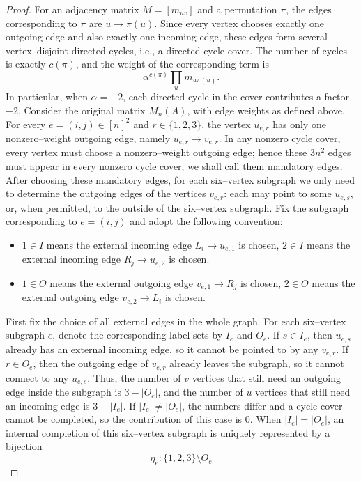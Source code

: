 \documentclass[10pt,a4paper]{amsart}
\begin{document}
\begin{proof}
For an adjacency matrix $M=[m_{uv}]$ and a permutation $\pi$, the edges corresponding to $\pi$ are $u\to\pi(u)$. Since every vertex chooses exactly one outgoing edge and also exactly one incoming edge, these edges form several vertex–disjoint directed cycles, i.e., a directed cycle cover. The number of cycles is exactly $c(\pi)$, and the weight of the corresponding term is
\[
  \alpha^{c(\pi)}\prod_u m_{u\pi(u)}.
\]
In particular, when $\alpha=-2$, each directed cycle in the cover contributes a factor $-2$. Consider the original matrix $M_n(A)$, with edge weights as defined above. For every $e=(i,j)\in[n]^2$ and $r\in\{1,2,3\}$, the vertex $u_{e,r}$ has only one nonzero–weight outgoing edge, namely $u_{e,r}\longrightarrow v_{e,r}$.
In any nonzero cycle cover, every vertex must choose a nonzero–weight outgoing edge; hence these $3n^2$ edges must appear in every nonzero cycle cover; we shall call them mandatory edges. After choosing these mandatory edges, for each six–vertex subgraph we only need to determine the outgoing edges of the vertices $v_{e,r}$: each may point to some $u_{e,s}$, or, when permitted, to the outside of the six–vertex subgraph. Fix the subgraph corresponding to $e=(i,j)$ and adopt the following convention:
\begin{itemize}
\item $1\in I$ means the external incoming edge $L_i\to u_{e,1}$ is chosen,
      $2\in I$ means the external incoming edge $R_j\to u_{e,2}$ is chosen.
\item $1\in O$ means the external outgoing edge $v_{e,1}\to R_j$ is chosen,
      $2\in O$ means the external outgoing edge $v_{e,2}\to L_i$ is chosen.
\end{itemize}
First fix the choice of all external edges in the whole graph. For each six–vertex subgraph $e$, denote the corresponding label sets by $I_e$ and $O_e$. If $s\in I_e$, then $u_{e,s}$ already has an external incoming edge, so it cannot be pointed to by any $v_{e,r}$. If $r\in O_e$, then the outgoing edge of $v_{e,r}$ already leaves the subgraph, so it cannot connect to any $u_{e,s}$. Thus, the number of $v$ vertices that still need an outgoing edge inside the subgraph is $3-|O_e|$, and the number of $u$ vertices that still need an incoming edge is $3-|I_e|$. If $|I_e|\ne|O_e|$, the numbers differ and a cycle cover cannot be completed, so the contribution of this case is $0$.
When $|I_e|=|O_e|$, an internal completion of this six–vertex subgraph is uniquely represented by a bijection
\[
  \eta_e:\{1,2,3\}\setminus O_e
\]
\end{proof}
\end{document}
